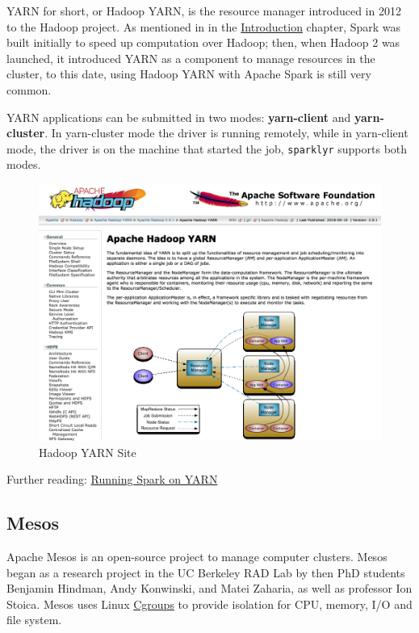 \documentclass[]{book}
\theoremstyle{definition}
\theoremstyle{definition}
\theoremstyle{definition}
\theoremstyle{remark}
\begin{document}
YARN for short, or Hadoop YARN, is the resource manager introduced in
2012 to the Hadoop project. As mentioned in in the
\protect\hyperlink{intro}{Introduction} chapter, Spark was built
initially to speed up computation over Hadoop; then, when Hadoop 2 was
launched, it introduced YARN as a component to manage resources in the
cluster, to this date, using Hadoop YARN with Apache Spark is still very
common.

YARN applications can be submitted in two modes: \textbf{yarn-client}
and \textbf{yarn-cluster}. In yarn-cluster mode the driver is running
remotely, while in yarn-client mode, the driver is on the machine that
started the job, \texttt{sparklyr} supports both modes.

\begin{figure}

{\centering \includegraphics[width=13.78in]{images/05-clusters-yarn} 

}

\caption{Hadoop YARN Site}\label{fig:hadoop-yarn}
\end{figure}

Further reading:
\href{https://spark.apache.org/docs/latest/running-on-yarn.html}{Running
Spark on YARN}

\hypertarget{mesos}{%
\subsection{Mesos}\label{mesos}}

Apache Mesos is an open-source project to manage computer clusters.
Mesos began as a research project in the UC Berkeley RAD Lab by then PhD
students Benjamin Hindman, Andy Konwinski, and Matei Zaharia, as well as
professor Ion Stoica. Mesos uses Linux
\href{https://en.wikipedia.org/wiki/Cgroups}{Cgroups} to provide
isolation for CPU, memory, I/O and file system.
\end{document}
